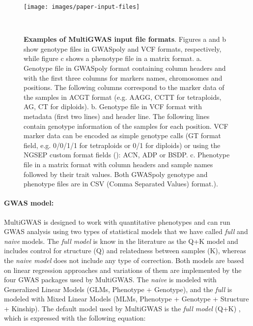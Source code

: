 \documentclass{article}
\begin{document}
\begin{figure}[H]
\begin{centering}
\texttt{[image: images/paper-input-files]}
\par\end{centering}
\caption{\scriptsize \textbf{{Examples of MultiGWAS input file formats}}. Figures a and b show genotype files in GWASpoly and VCF formats, respectively, while figure c shows a phenotype file in a matrix format. a. Genotype file in GWASpoly format containing column headers and with the first three columns for markers names, chromosomes and positions. The following columns correspond to the marker data of the samples in \textquotedbl{}ACGT\textquotedbl{} format (e.g. AAGG, CCTT for tetraploids, AG, CT for diploids). b. Genotype file in VCF format with metadata (first two lines) and header line. The following lines contain genotype information of the samples for each position. VCF marker data can be encoded as simple genotype calls (GT format field, e.g. 0/0/1/1 for tetraploids or 0/1 for diploids) or using the NGSEP custom format fields (\cite{Duitama2019}): ACN, ADP or BSDP. c. Phenotype file in a matrix format with column headers and sample names followed by their trait values. Both GWASpoly genotype and phenotype files are in CSV (Comma Separated Values) format.).} \label{fig:File-Formats}\protect \\
\end{figure}


\paragraph{GWAS model:}

MultiGWAS is designed to work with quantitative phenotypes and can run GWAS analysis using two types of statistical models that we have called \emph{full} and \emph{naive} models. The \emph{full model} is know in the literature as the Q+K model \cite{Yu2006} and includes control for structure (Q) and relatedness between samples (K), whereas the \emph{naive model} does not include any type of correction. Both models are based on linear regression approaches and variations of them are implemented by the four GWAS packages used by MultiGWAS. The \emph{naive} is modeled with Generalized Linear Models (GLMs, Phenotype + Genotype), and the \emph{full} is modeled with Mixed Linear Models (MLMs, Phenotype + Genotype + Structure + Kinship). The default model used by MultiGWAS is the \emph{full model} (Q+K) \cite{Yu2006}, which is expressed with the following equation:
\end{document}
